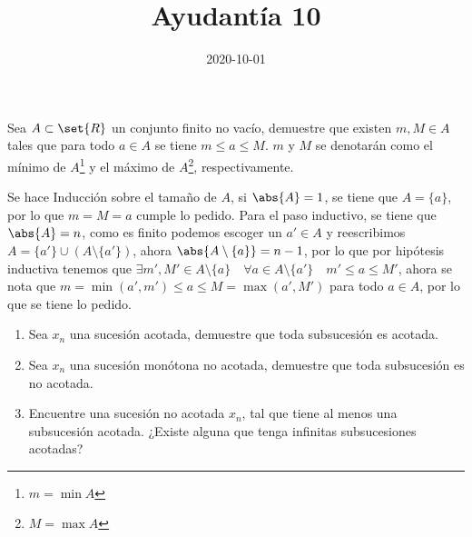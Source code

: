 \documentclass{ayudantia}
\title{Ayudantía 10}
\date{2020-10-01}
\begin{document}
\maketitle

\begin{prob}
    Sea \(A\subset\set{R}\) un conjunto finito no vacío, demuestre que existen \(m,M\in A\) tales que para todo \(a\in A\) se tiene \(m\leq a\leq M\). \(m\) y \(M\) se denotarán como el mínimo de \(A\)\footnote{\(m=\min A\)} y el máximo de \(A\)\footnote{\(M=\max A\)}, respectivamente.
\end{prob}

\begin{ans}
    \begin{sol}
        Se hace Inducción sobre el tamaño de \(A\), si \(\abs{A}=1\), se tiene que \(A=\{a\}\), por lo que \(m=M=a\) cumple lo pedido. Para el paso inductivo, se tiene que \(\abs{A}=n\), como es finito podemos escoger un \(a'\in A\) y reescribimos \(A=\{a'\}\cup(A\setminus\{a'\})\), ahora \(\abs{A\setminus\{a\}}=n-1\), por lo que por hipótesis inductiva tenemos que \(\exists m',M'\in A\setminus\{a\}\quad\forall a\in A\setminus\{a'\}\quad m'\leq a\leq M'\), ahora se nota que \(m=\min(a',m')\leq a\leq M=\max(a',M')\) para todo \(a\in A\), por lo que se tiene lo pedido.
    \end{sol}
\end{ans}


\begin{prob}
    \begin{enumerate}
        \item Sea \(x_n\) una sucesión acotada, demuestre que toda subsucesión es acotada.
        \item Sea \(x_n\) una sucesión monótona no acotada, demuestre que toda subsucesión es no acotada.
        \item Encuentre una sucesión no acotada \(x_n\), tal que tiene al menos una subsucesión acotada. ¿Existe alguna que tenga infinitas subsucesiones acotadas?
    \end{enumerate}
\end{prob}
\end{document}
